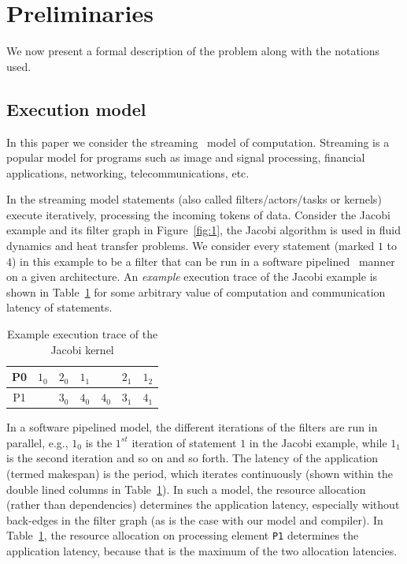 \documentclass[10pt, conference, compsocconf]{IEEEtran}
\begin{document}
\section{Preliminaries}
\label{sec:preliminaries}

We now present a formal description of the problem along with the
notations used.

\subsection{Execution model}
\label{sec:execution-model}

In this paper we consider the streaming~\cite{jbuck94} model of
computation. Streaming is a popular model for programs such as image and
signal processing, financial applications, networking,
telecommunications, etc.

In the streaming model statements (also called filters/actors/tasks or
kernels) execute iteratively, processing the incoming tokens of
data. Consider the Jacobi example and its filter graph in
Figure~\ref{fig:1}, the Jacobi algorithm is used in fluid dynamics and
heat transfer problems. We consider every statement (marked $1$ to $4$)
in this example to be a filter that can be run in a software
pipelined~\cite{audu09} manner on a given architecture. An
\textit{example} execution trace of the Jacobi example is shown in
Table~\ref{tab:3} for some arbitrary value of computation and
communication latency of statements.

\begin{table}[h!]
  \centering
  \begin{tabular}{|c|c|c||c|c|c||c|}
    \hline
    P0 & $1_0$ & $2_0$ & $1_1$ & & $2_1$ & $1_2$\\
    \hline
    P1 & & $3_0$ & $4_0$ & $4_0$ & $3_1$ & $4_1$\\
    \hline
  \end{tabular}
  \caption{Example execution trace of the Jacobi kernel}
  \label{tab:3}
\end{table}

In a software pipelined model, the different iterations of the filters
are run in parallel, e.g., $1_0$ is the $1^{st}$ iteration of statement
$1$ in the Jacobi example, while $1_1$ is the second iteration and so on
and so forth. The latency of the application (termed makespan) is the
period, which iterates continuously (shown within the double lined
columns in Table~\ref{tab:3}). In such a model, the resource allocation
(rather than dependencies) determines the application latency,
especially without back-edges in the filter graph (as is the case with
our model and compiler). In Table~\ref{tab:3}, the resource allocation
on processing element \texttt{P1} determines the application latency,
because that is the maximum of the two allocation latencies.
\end{document}
